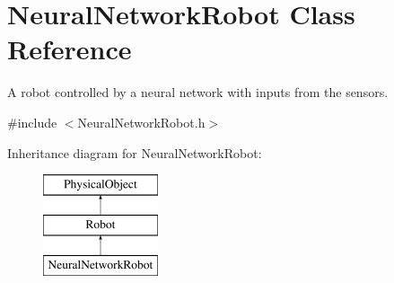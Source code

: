 \hypertarget{classNeuralNetworkRobot}{\section{Neural\-Network\-Robot Class Reference}
\label{classNeuralNetworkRobot}
}


A robot controlled by a neural network with inputs from the sensors.  




{\ttfamily \#include $<$Neural\-Network\-Robot.\-h$>$}

Inheritance diagram for Neural\-Network\-Robot\-:\begin{figure}[H]
\begin{center}
\leavevmode
\includegraphics[height=3.000000cm]{classNeuralNetworkRobot}
\end{center}
\end{figure}
